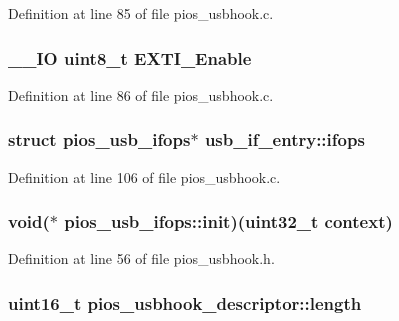 \-Definition at line 85 of file pios\-\_\-usbhook.\-c.

\hypertarget{group___p_i_o_s___u_s_b_h_o_o_k_ga80e4a20c4f7576283232cda440c47694}{
\subsubsection[{\-E\-X\-T\-I\-\_\-\-Enable}]{\setlength{\rightskip}{0pt plus 5cm}\-\_\-\-\_\-\-I\-O uint8\-\_\-t {\bf \-E\-X\-T\-I\-\_\-\-Enable}}}\label{group___p_i_o_s___u_s_b_h_o_o_k_ga80e4a20c4f7576283232cda440c47694}


\-Definition at line 86 of file pios\-\_\-usbhook.\-c.

\hypertarget{group___p_i_o_s___u_s_b_h_o_o_k_ga8c6a8d1a868734fd250c8af665a54c3c}{
\subsubsection[{ifops}]{\setlength{\rightskip}{0pt plus 5cm}struct {\bf pios\-\_\-usb\-\_\-ifops}$\ast$ {\bf usb\-\_\-if\-\_\-entry\-::ifops}}}\label{group___p_i_o_s___u_s_b_h_o_o_k_ga8c6a8d1a868734fd250c8af665a54c3c}


\-Definition at line 106 of file pios\-\_\-usbhook.\-c.

\hypertarget{group___p_i_o_s___u_s_b_h_o_o_k_ga08614658e728cfb81cb4091e3e210624}{
\subsubsection[{init}]{\setlength{\rightskip}{0pt plus 5cm}void($\ast$ {\bf pios\-\_\-usb\-\_\-ifops\-::init})(uint32\-\_\-t context)}}\label{group___p_i_o_s___u_s_b_h_o_o_k_ga08614658e728cfb81cb4091e3e210624}


\-Definition at line 56 of file pios\-\_\-usbhook.\-h.

\hypertarget{group___p_i_o_s___u_s_b_h_o_o_k_ga9cc49b35b49236ac74e747d179a3650f}{
\subsubsection[{length}]{\setlength{\rightskip}{0pt plus 5cm}uint16\-\_\-t {\bf pios\-\_\-usbhook\-\_\-descriptor\-::length}}}\label{group___p_i_o_s___u_s_b_h_o_o_k_ga9cc49b35b49236ac74e747d179a3650f}


